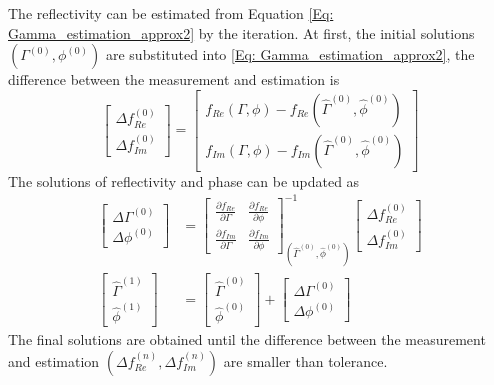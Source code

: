 \documentclass[draftcls,onecolumn]{IEEEtran}  %
\begin{document}
The reflectivity can be estimated from Equation \ref{Eq: Gamma_estimation_approx2} by the iteration. At first, the initial solutions $(\Gamma^{(0)}, \phi^{(0)})$ are substituted into \ref{Eq: Gamma_estimation_approx2}, the difference between the measurement  and estimation is  
\begin{equation}
\begin{bmatrix} \Delta f_{Re}^{(0)} \\ \Delta f_{Im}^{(0)} \end{bmatrix} = 
\begin{bmatrix} f_{Re}(\Gamma, \phi) -  f_{Re}(\hat{\Gamma}^{(0)}, \hat{\phi}^{(0)})\\ f_{Im}(\Gamma, \phi) -  f_{Im}(\hat{\Gamma}^{(0)}, \hat{\phi}^{(0)})\end{bmatrix}
\label{Eq: LSQ1}
\end{equation}
The solutions of reflectivity and phase can be updated as
\begin{align}
 \begin{bmatrix} \Delta \Gamma^{(0)} \\ \Delta \phi^{(0)} \end{bmatrix} &=
 \begin{bmatrix}
        \frac{\partial f_{Re}}{\partial \Gamma}      &  \frac{\partial f_{Re}}{\partial \phi}  \\
        \frac{\partial f_{Im}}{\partial \Gamma}      &  \frac{\partial f_{Im}}{\partial \phi}  
    \end{bmatrix} ^{-1} _{(\hat{\Gamma}^{(0)} ,\hat{\phi}^{(0)})}
    \begin{bmatrix} \Delta f_{Re}^{(0)} \\ \Delta f_{Im}^{(0)} \end{bmatrix} \\
\begin{bmatrix} \hat{\Gamma}^{(1)} \\\hat{\phi}^{(1)} \end{bmatrix}  &= 
\begin{bmatrix} \hat{\Gamma}^{(0)} \\ \hat{\phi}^{(0)} \end{bmatrix}  + \begin{bmatrix} \Delta \Gamma^{(0)} \\ \Delta \phi^{(0)} \end{bmatrix}
\label{Eq: LSQ2}
\end{align}
The final solutions are obtained until  the difference between the measurement  and estimation $(\Delta f_{Re}^{(n)} , \Delta f_{Im}^{(n)}) $  are smaller than tolerance.
\end{document}

